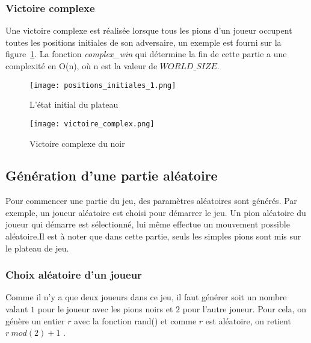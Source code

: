 \documentclass[11pt]{article}
\begin{document}
                \subsubsection*{Victoire complexe}
                Une victoire complexe est réalisée lorsque tous les pions d'un joueur occupent toutes les positions initiales de son adversaire, un exemple est fourni sur la figure~\ref{figure21}. La fonction \textit{complex\_win} qui détermine la fin de cette partie a une complexité en O(n), où n est la valeur de $WORLD\_SIZE$.
                \begin{figure}[h]
                \begin{minipage}[c]{0.45\linewidth}
                    \centering
                    \texttt{[image: positions\_initiales\_1.png]}
                    \caption{L'état initial du plateau }
                    \label{figure20}
                \end{minipage}
                \hfill
                \begin{minipage}[c]{0.45\linewidth}
                    \centering
                    \texttt{[image: victoire\_complex.png]}
                    \caption{Victoire complexe du noir}
                    \label{figure21}
                \end{minipage}
            \end{figure}
        \subsection{Génération d'une partie aléatoire}
        Pour commencer une partie du jeu, des paramètres aléatoires sont générés. Par exemple, un joueur aléatoire est choisi pour démarrer le jeu. Un pion aléatoire du joueur qui démarre est sélectionné, lui même effectue un mouvement possible aléatoire.Il est à noter que dans cette partie, seuls les simples pions sont mis sur le plateau de jeu.
        
            \subsubsection*{Choix aléatoire d'un joueur  }
                Comme il n'y a que deux joueurs dans ce jeu, il faut générer soit un nombre valant $1$ pour le joueur avec les pions noirs et $2$ pour l'autre joueur. Pour cela, on génère un entier $r$ avec la fonction rand() et comme $r$ est aléatoire, on retient $r \ mod (2) + 1$ . %
\end{document}
